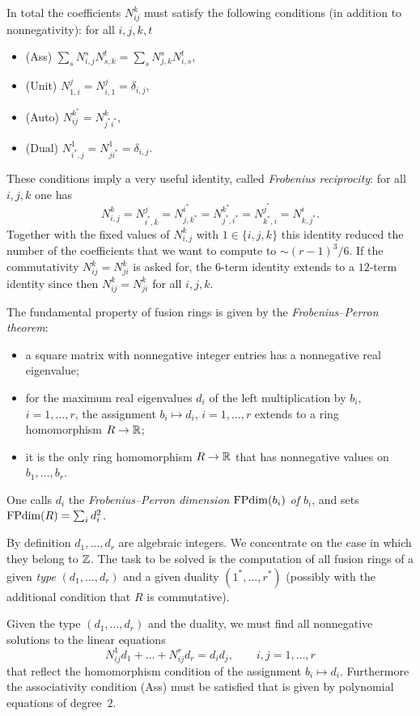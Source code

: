 In total the coefficients $N_{ij}^k$ must satisfy the following conditions (in addition to nonnegativity): for all $i,j,k,t$
\begin{itemize}
	\item (Ass) $\sum_s N_{i,j}^s N_{s,k}^t = \sum_s N_{j,k}^s N_{i,s}^t$,		
	\item (Unit) $N_{1,i}^j = N_{i,1}^j = \delta_{i,j}$,	
	\item (Auto) $N_{ij}^{k^*} = N_{j^*i^*}^k$,			
	\item (Dual) $N_{i^*,j}^{1} = N_{ji^*}^{1} = \delta_{i,j}$.					
\end{itemize}

These conditions imply a very useful identity, called \emph{Frobenius reciprocity}:
for all $i,j,k$ one has
$$
N_{i,j}^k = N_{i^*,k}^j = N_{j,k^*}^{i^*} = N_{j^*, i^*}^{k^*} = N_{k^*, i}^{j^*} = N_{k, j^*}^{i}.
$$
Together with the fixed values of $N_{i,j}^k$ with $1\in\{i,j,k\}$ this identity reduced the number of the coefficients that we want to compute to $\sim (r-1)^3/6$. If the commutativity $N_{ij}^k = N_{ji}^k$ is asked for, the $6$-term identity extends to a $12$-term identity since then $N_{ij}^k= N_{ji}^k$ for all $i,j,k$. 

The fundamental property of fusion rings is given by the \emph{Frobenius--Perron theorem}:
\begin{itemize}
\item a square matrix with nonnegative integer entries has a nonnegative real eigenvalue;
\item for the maximum real eigenvalues $d_i$ of the left multiplication by $b_i$, $i=1,\dots,r$, the assignment $b_i \mapsto d_i$, $i=1,\dots,r$ extends to a ring homomorphism $R\to {\mathbb R}$;
\item it is the only ring homomorphism $R\to {\mathbb R}$ that has nonnegative values on $b_1,\dots,b_r$.
\end{itemize}

One calls $d_i$ the  \label{FPdim} \emph{Frobenius--Perron dimension $\operatorname{FPdim}(b_i)$ of $b_i$}, and sets $\operatorname{FPdim}(R) = \sum_i d_i^2$.

By definition $d_1,\dots,d_r$ are algebraic integers. We concentrate on the case in which they belong to ${\mathbb Z}$. The task to be solved is the computation of all fusion rings of a given \emph{type} $(d_1,\dots,d_r)$ and a given duality $(1^*,\dots,r^*)$ (possibly with the additional condition that $R$ is commutative).

Given the type $(d_1,\dots,d_r)$ and the duality, we must find all nonnegative solutions to the linear equations
$$
N_{ij}^1d_1 +\dots + N_{ij}^rd_r = d_id_j, \qquad i,j = 1,\dots,r
$$
that reflect the homomorphism condition of the assignment $b_i\mapsto d_i$. Furthermore the associativity condition (Ass) must be satisfied that is given by polynomial equations of degree~$2$.

